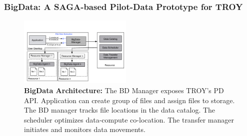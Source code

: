 \subsubsection*{BigData: A SAGA-based Pilot-Data Prototype for TROY}
\label{sec:bigdata}

\begin{figure}[t]
    \centering
    \includegraphics[width=0.48\textwidth]{figures/pilot-data-manager.pdf}
    \caption{\textbf{BigData Architecture:} The BD Manager exposes
      TROY's PD API. Application can create group of files and assign
      files to storage. The BD manager tracks file locations in the
      data catalog. The scheduler optimizes data-compute co-location.
      The transfer manager initiates and monitors data
      movements. \up\up}
    \label{fig:pilot-data-architecture}
\end{figure}


